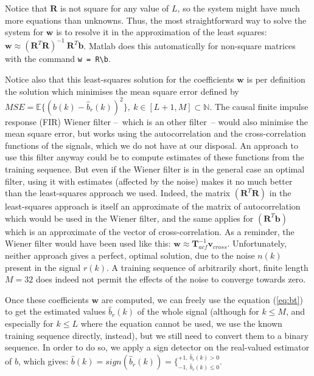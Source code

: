 \documentclass[twocolumn, 12pt]{IEEEtran}
\begin{document}
Notice that $\bm{R}$ is not square for any value of $L$, so the system might have much more equations than unknowns. Thus, {\color{my-light-blue}the most straightforward way to solve the system for $\bm{w}$ is to resolve it} in the approximation of the least squares: $\bm{w} \approx (\bm{R}^{T}\bm{R})^{-1}~\bm{R}^{T}\bm{b}$. Matlab does this automatically for non-square matrices with the command \texttt{w~=~R\textbackslash b}.

{\color{my-light-blue} Notice also that this least-squares solution for the coefficients $\bm{w}$ is per definition the solution which minimises the mean square error defined by ${MSE = \mathbb{E}\{(b(k)-\hat{b}_r(k))^2\}},~{k\in[L+1, M]\subset \mathbb{N}}$. 
The causal finite impulse response (FIR) Wiener filter --~which is an other filter~-- would also minimise the mean square error, but works using the autocorrelation and the cross-correlation functions of the signals, which we do not have at our disposal. An approach to use this filter anyway could be to compute estimates of these functions from the training sequence. But even if the Wiener filter is in the general case an optimal filter, using it with estimates (affected by the noise) makes it no much better than the least-squares approach we used. Indeed, the matrix ${(\bm{R}^T\bm{R})}$ in the least-squares approach is itself an approximate of the matrix of autocorrelation which would be used in the Wiener filter, and the same applies for ${(\bm{R}^T\bm{b})}$ which is an approximate of the vector of cross-correlation. As a reminder, the Wiener filter would have been used like this: ${\bm{w}\approx\bm{T}_{acf}^{-1}\bm{v}_{cross}}$. Unfortunately, neither approach gives a perfect, optimal solution, due to the noise $n(k)$ present in the signal $r(k)$. A training sequence of arbitrarily short, finite length $M=32$ does indeed not permit the effects of the noise to converge towards zero.
}

Once these coefficients $\bm{w}$ are computed, we can freely use the equation (\ref{eq:bt}) to get the estimated values $\hat{b}_{r}(k)$ of the whole signal (although for $k \leq M$, and especially for $k \leq L$ where the equation cannot be used, we use the known training sequence directly, instead), but we still need to convert them to a binary sequence. In order to do so, we apply a sign detector on the real-valued estimator of $b$, which gives: $\hat{b}(k) = sign(\hat{b}_{r}(k)) = \{_{-1,~\hat{b}_{r}(k) \leq 0}^{+1,~\hat{b}_{r}(k) > 0}$.
\end{document}
